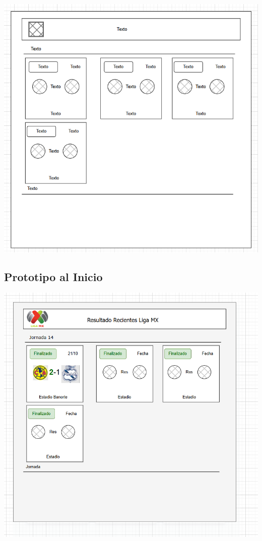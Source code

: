 \documentclass[11pt]{scrartcl}
\begin{document}
\begin{center}
    \includegraphics[scale=0.7]{wireframe.png}
\end{center}

\subsection{Prototipo al Inicio}
\begin{center}
    \includegraphics[scale=0.7]{prototipo_1,0.png}
\end{center}
\end{document}
